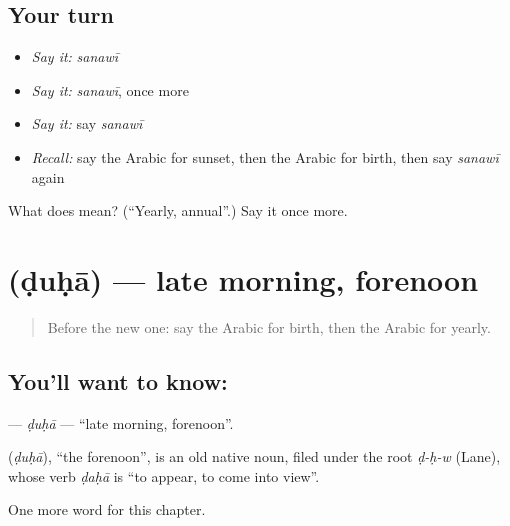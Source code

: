 \subsection*{Your turn}
\begin{itemize}
\raggedright
  \item \emph{Say it:} \emph{sanawī}
  \item \emph{Say it:} \emph{sanawī}, once more
  \item \emph{Say it:} say \emph{sanawī}
  \item \emph{Recall:} say the Arabic for sunset, then the Arabic for birth, then say \emph{sanawī} again
\end{itemize}

\begin{tcolorbox}[breakable,colback=teal!4,colframe=teal!35!black,title={Before you move on}]
What does  mean? (\textquotedblleft{}Yearly, annual\textquotedblright{}.) Say it once more.
\end{tcolorbox}
\section[\texorpdfstring{\ar{ضحى} (ḍuḥā)}{ضحى (ḍuḥā)}]{ (ḍuḥā) — late morning, forenoon}

\label{lesson:AR-C234-duha}



\begin{quote}
Before the new one: say the Arabic for birth, then the Arabic for yearly.
\end{quote}

\subsection*{You'll want to know: }
\textbf{} — \emph{ḍuḥā} — \textquotedblleft{}late morning, forenoon\textquotedblright{}.

\begin{cousinweb}
\textbf{} (\emph{ḍuḥā}), \textquotedblleft{}the forenoon\textquotedblright{}, is an old native noun, filed under the root \emph{ḍ-ḥ-w} (Lane), whose verb \emph{ḍaḥā} is \textquotedblleft{}to appear, to come into view\textquotedblright{}.
\end{cousinweb}

\begin{grammarlens}[title={What you've built}]
One more word for this chapter.
\end{grammarlens}

